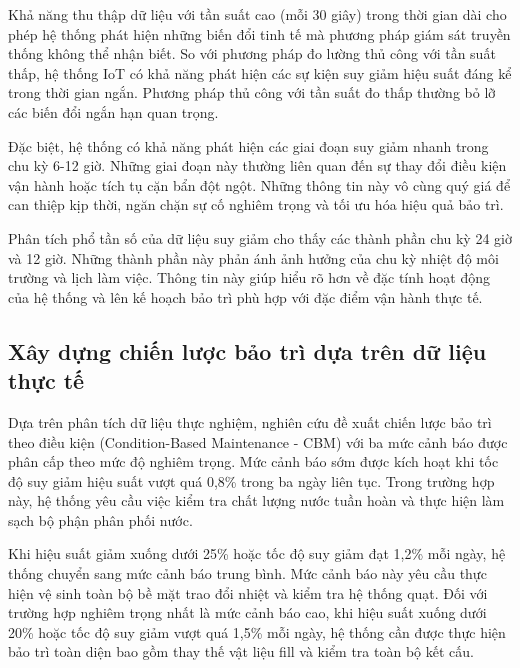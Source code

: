 \documentclass[../main.tex]{subfiles}
\begin{document}
Khả năng thu thập dữ liệu với tần suất cao (mỗi 30 giây) trong thời gian dài cho phép hệ thống phát hiện những biến đổi tinh tế mà phương pháp giám sát truyền thống không thể nhận biết. So với phương pháp đo lường thủ công với tần suất thấp, hệ thống IoT có khả năng phát hiện các sự kiện suy giảm hiệu suất đáng kể trong thời gian ngắn. Phương pháp thủ công với tần suất đo thấp thường bỏ lỡ các biến đổi ngắn hạn quan trọng.

Đặc biệt, hệ thống có khả năng phát hiện các giai đoạn suy giảm nhanh trong chu kỳ 6-12 giờ. Những giai đoạn này thường liên quan đến sự thay đổi điều kiện vận hành hoặc tích tụ cặn bẩn đột ngột. Những thông tin này vô cùng quý giá để can thiệp kịp thời, ngăn chặn sự cố nghiêm trọng và tối ưu hóa hiệu quả bảo trì.

Phân tích phổ tần số của dữ liệu suy giảm cho thấy các thành phần chu kỳ 24 giờ và 12 giờ. Những thành phần này phản ánh ảnh hưởng của chu kỳ nhiệt độ môi trường và lịch làm việc. Thông tin này giúp hiểu rõ hơn về đặc tính hoạt động của hệ thống và lên kế hoạch bảo trì phù hợp với đặc điểm vận hành thực tế.

\subsection{Xây dựng chiến lược bảo trì dựa trên dữ liệu thực tế}
\label{sec:data_driven_maintenance_strategy}

Dựa trên phân tích dữ liệu thực nghiệm, nghiên cứu đề xuất chiến lược bảo trì theo điều kiện (Condition-Based Maintenance - CBM) với ba mức cảnh báo được phân cấp theo mức độ nghiêm trọng. Mức cảnh báo sớm được kích hoạt khi tốc độ suy giảm hiệu suất vượt quá 0,8\% trong ba ngày liên tục. Trong trường hợp này, hệ thống yêu cầu việc kiểm tra chất lượng nước tuần hoàn và thực hiện làm sạch bộ phận phân phối nước.

Khi hiệu suất giảm xuống dưới 25\% hoặc tốc độ suy giảm đạt 1,2\% mỗi ngày, hệ thống chuyển sang mức cảnh báo trung bình. Mức cảnh báo này yêu cầu thực hiện vệ sinh toàn bộ bề mặt trao đổi nhiệt và kiểm tra hệ thống quạt. Đối với trường hợp nghiêm trọng nhất là mức cảnh báo cao, khi hiệu suất xuống dưới 20\% hoặc tốc độ suy giảm vượt quá 1,5\% mỗi ngày, hệ thống cần được thực hiện bảo trì toàn diện bao gồm thay thế vật liệu fill và kiểm tra toàn bộ kết cấu.
\end{document}
